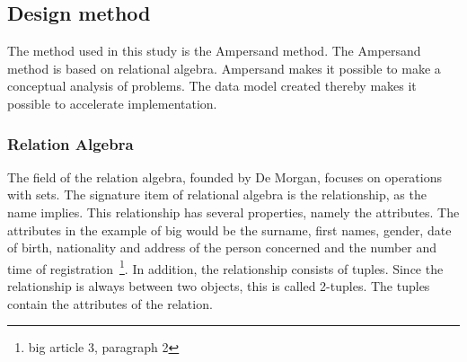\subsection{Design method} \label{design_method}
The method used in this study is the Ampersand method.
The Ampersand method is based on relational algebra.
Ampersand makes it possible to make a conceptual analysis of problems. The data model created thereby makes it possible to accelerate implementation.


\subsubsection{Relation Algebra} \label{relation_algebra}
The field of the relation algebra, founded by De Morgan, focuses on operations with sets.
%
The signature item of relational algebra is the relationship, as the name implies.
This relationship has several properties, namely the attributes.
The attributes in the example of \acrshort{big} would be the surname, first names, gender, date of birth, nationality and address of the person concerned and the number and time of registration~\footnote{\acrlong{big} article 3, paragraph 2}.
In addition, the relationship consists of tuples.
Since the relationship is always between two objects, this is called 2-tuples.
The tuples contain the attributes of the relation.

